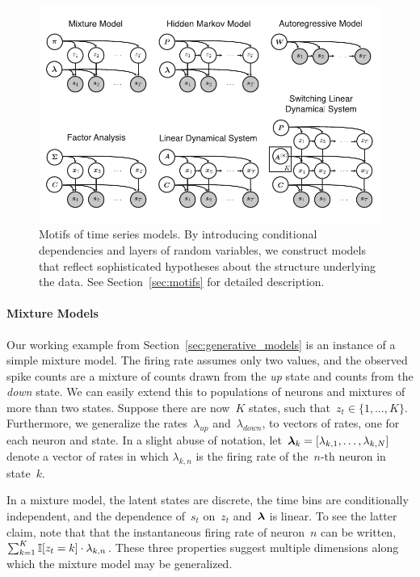 \begin{figure}[t]
  \centering%
\includegraphics[width=5.5in]{figures/ch2/figure2b} 
\vspace{-.25in}
\caption[Motifs of time series models]{Motifs of time series models.
  By introducing conditional dependencies and layers of random
  variables, we construct models that reflect sophisticated hypotheses
  about the structure underlying the data.  See
  Section~\ref{sec:motifs} for detailed description.}
\label{fig:motifs}
\end{figure}


\paragraph{Mixture Models}
Our working example from Section~\ref{sec:generative_models} is an
instance of a simple mixture model.  The firing rate assumes
only two values, and the observed spike counts are a mixture of counts
drawn from the \textit{up} state and counts from the \textit{down}
state. We can easily extend this to populations of neurons and
mixtures of more than two states.  Suppose there are now~$K$ states,
such that~${z_t \in \{1, \ldots, K\}}$. Furthermore, we generalize the
rates~$\lambda_{\textit{up}}$ and~$\lambda_{\textit{down}}$, to
vectors of rates, one for each neuron and state.  In a slight abuse of
notation, let~${\boldsymbol{\lambda}_k = [\lambda_{k,1}, \ldots, \lambda_{k,N}]}$
denote a vector of rates in which $\lambda_{k,n}$ is the firing rate of
the~${n\text{-th}}$ neuron in state~$k$.

In a mixture model, the latent states are discrete, the time bins are
conditionally independent, and the dependence of~$s_t$ on~$z_t$
and~$\boldsymbol{\lambda}$ is linear.  To see the latter claim, note that that the
instantaneous firing rate of neuron~$n$ can be written,
${\sum_{k=1}^K \mathbb{I}[z_t=k] \cdot \lambda_{k,n}}$. These three
properties suggest multiple dimensions along which the mixture model
may be generalized.

